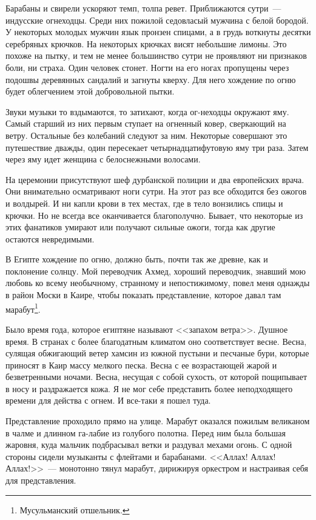 \documentclass[12pt,a4paper,twoside,openany,svgnames]{memoir}
\begin{document}
Барабаны и свирели ускоряют темп, толпа ревет. Приближаются сутри~--- индусские огнеходцы. Среди них пожилой седовласый мужчина с белой бородой. У некоторых молодых мужчин язык пронзен спицами, а в грудь воткнуты десятки серебряных крючков. На некоторых крючках висят небольшие лимоны. Это похоже на пытку, и тем не менее большинство сутри не проявляют ни признаков боли, ни страха. Один человек стонет. Ногти на его ногах пропущены через подошвы деревянных сандалий и загнуты кверху. Для него хождение по огню будет облегчением этой добровольной пытки.

Звуки музыки то вздымаются, то затихают, когда ог-неходцы окружают яму. Самый старший из них первым ступает на огненный ковер, сверкающий на ветру. Остальные без колебаний следуют за ним. Некоторые совершают это путешествие дважды, один пересекает четырнадцатифутовую яму три раза. Затем через яму идет женщина с белоснежными волосами.

На церемонии присутствуют шеф дурбанской полиции и два европейских врача. Они внимательно осматривают ноги сутри. На этот раз все обходится без ожогов и волдырей. И ни капли крови в тех местах, где в тело вонзились спицы и крючки. Но не всегда все оканчивается благополучно. Бывает, что некоторые из этих фанатиков умирают или получают сильные ожоги, тогда как другие остаются невредимыми.

В Египте хождение по огню, должно быть, почти так же древне, как и поклонение солнцу. Мой переводчик Ахмед, хороший переводчик, знавший мою любовь ко всему необычному, странному и непостижимому, повел меня однажды в район Моски в Каире, чтобы показать представление, которое давал там марабут\footnote{Мусульманский отшельник.}.

Было время года, которое египтяне называют <<запахом ветра>>. Душное время. В странах с более благодатным климатом оно соответствует весне. Весна, сулящая обжигающий ветер хамсин из южной пустыни и песчаные бури, которые приносят в Каир массу мелкого песка. Весна с ее возрастающей жарой и безветренными ночами. Весна, несущая с собой сухость, от которой пощипывает в носу и раздражается кожа. Я не мог себе представить более неподходящего времени для действа с огнем. И все-таки я пошел туда.

Представление проходило прямо на улице. Марабут оказался пожилым великаном в чалме и длинном га-лабие из голубого полотна. Перед ним была большая жаровня, куда мальчик подбрасывал ветки и раздувал мехами огонь. С одной стороны сидели музыканты с флейтами и барабанами. <<Аллах! Аллах! Аллах!>>~--- монотонно тянул марабут, дирижируя оркестром и настраивая себя для представления.
\end{document}
